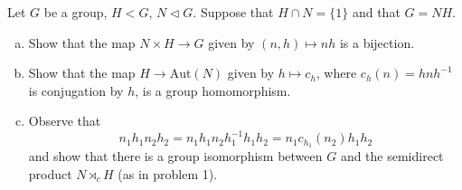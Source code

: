 \documentclass{article}
\newcounter{Problem}
\newenvironment{Problem}{\begin{Exercise}[name={Problem},
                                          counter={Problem}]}
                        {\end{Exercise}}
\begin{document}
\begin{Problem}
Let $G$ be a group, $H < G$, $N \triangleleft G$. Suppose that 
$H \cap N = \{ 1 \}$ and that $G = NH$.
\begin{enumerate}[(a)]
  \item{Show that the map $N \times H \to G$ given by
        $(n, h) \mapsto nh$ is a bijection.}
  \item{Show that the map $H \to \mathrm{Aut}(N)$ given by
      $h \mapsto c_h$, where $c_h(n) = h n h^{-1}$ is conjugation by
      $h$, is a group homomorphism.}
  \item{Observe that 
        $$
        n_1 h_1 n_2 h_2 
      = n_1 h_1 n_2 h_1^{-1} h_1 h_2
      = n_1 c_{h_1}(n_2) h_1 h_2
        $$
        and show that there is a group isomorphism between $G$ and the
        semidirect product $N \rtimes_c H$ (as in problem 1).}
\end{enumerate}
\end{Problem}
\end{document}
